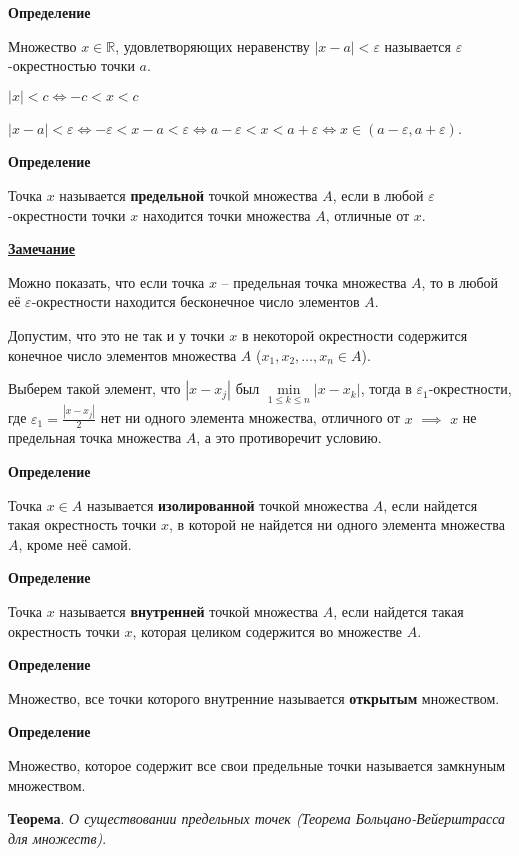 \documentclass{article}
\begin{document}
\textbf{Определение}

Множество $x \in \mathbb{R}$, удовлетворяющих неравенству $|x - a| < \varepsilon$
называется $\varepsilon$-окрестностью точки $a$.

$|x| < c \Leftrightarrow -c < x < c$

$|x - a| < \varepsilon \Leftrightarrow -\varepsilon < x - a < \varepsilon \Leftrightarrow
a - \varepsilon < x < a + \varepsilon \Leftrightarrow x \in (a - \varepsilon, a + \varepsilon)$.

\textbf{Определение}

Точка $x$ называется \textbf{предельной} точкой множества $A$, если в любой $\varepsilon$-окрестности
точки $x$ находится точки множества $A$, отличные от $x$.

\underline{\textbf{Замечание}}

Можно показать, что если точка $x$ -- предельная точка множества $A$, то в любой её
$\varepsilon$-окрестности находится бесконечное число элементов $A$.

Допустим, что это не так и у точки $x$ в некоторой окрестности содержится конечное
число элементов множества $A$ ($x_1,x_2,\dots,x_n \in A$).

Выберем такой элемент, что $|x - x_j|$ был $\underset{1 \le k \le n}{\min} |x - x_k|$,
тогда в $\varepsilon_1$-окрестности, где $\varepsilon_1 = \frac{|x - x_j|}{2}$ нет ни
одного элемента множества, отличного от $x$ $\implies$ $x$ не предельная точка множества
$A$, а это противоречит условию.

\textbf{Определение}

Точка $x \in A$ называется \textbf{изолированной} точкой множества $A$, если найдется такая
окрестность точки $x$, в которой не найдется ни одного элемента множества $A$,
кроме неё самой.

\textbf{Определение}

Точка $x$ называется \textbf{внутренней} точкой множества $A$, если найдется такая
окрестность точки $x$, которая целиком содержится во множестве $A$.

\textbf{Определение}

Множество, все точки которого внутренние называется \textbf{открытым} множеством.

\textbf{Определение}

Множество, которое содержит все свои предельные точки называется замкнуным множеством.

\textbf{Теорема}. \textit{О существовании предельных точек (Теорема Больцано-Вейерштрасса для множеств)}.
\end{document}
